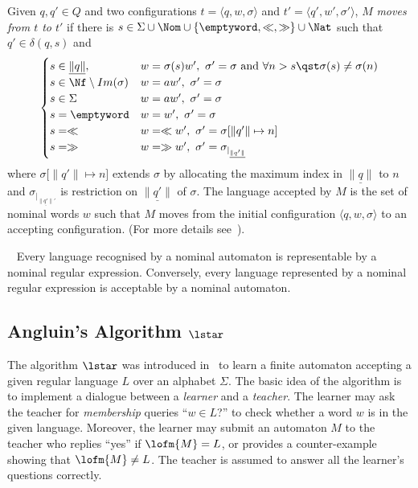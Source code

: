   Given $q,q'\in Q$ and two configurations
  $t=\langle q,w,\sigma\rangle$ and
  $t'=\langle q',w',\sigma' \rangle$, $M$ \emph{moves from $t$ to
    $t'$} if there is
  $s \in \Sigma \cup \Nom \cup \{\emptyword,\ll,\gg\} \cup \Nat$
  such that $q'\in \delta(q,s)$ and
  \[\begin{cases}
      s \in \underline{\|q\|}, & w=\sigma(s)w',\ \sigma'=\sigma \text{ and } \forall n > s \qst \sigma(s) \neq \sigma(n)
      \\
      s \in \Nf \setminus Im(\sigma) & w=aw',\ \sigma'=\sigma
      \\
      s \in \Sigma & w=aw',\ \sigma'=\sigma
      \\
      s = \emptyword & w=w',\ \sigma'=\sigma
      \\
      s = \ll & w=\ll w',\ \sigma' = \sigma \lbrack \|q'\| \mapsto n \rbrack
      \\
      s = \gg & w=\gg w', \ \sigma' = \sigma_{|_{\underline{\|q'\|}}}
    \end{cases}
  \]
  where $\sigma\lbrack\|q'\| \mapsto n\rbrack$ extends $\sigma$ by
  allocating the maximum index in $\underline{\|q\|}$ to $n$ and
  $\sigma_{|_{\underline{\|q'\|}'}}$ is restriction on
  $\underline{\|q'\|} $ of $\sigma$.
  The language accepted by $M$ is the set of nominal words $w$ such
  that $M$ moves from the initial configuration
  $\langle q,w,\sigma\rangle$ to an accepting configuration.
  (For more details see~\cite{Kurz0T12,Kurz0T13}).
  

  \begin{theorem}~\cite{Kurz0T2012}\label{thm:kleeneforNA} Every
    language recognised by a nominal automaton is representable by a
    nominal regular expression. Conversely, every language represented
    by a nominal regular expression is acceptable by a nominal
    automaton.
\end{theorem}


\subsection{Angluin's Algorithm $\lstar$}\label{st:Lstar}
The algorithm $\lstar$ was introduced in~\cite{Angluin87} to learn a
finite automaton accepting a given regular language $L$ over an
alphabet $\Sigma$.
%
The basic idea of the algorithm is to implement a dialogue between a
\emph{learner} and a \emph{teacher}.
%
The learner may ask the teacher for \textit{membership} queries
``$w \in L$?'' to check whether a word $w$ is in the given
language.
%
Moreover, the learner may submit an automaton $M$ to the teacher who
replies ``yes'' if $\lofm{M} = L$, or provides a counter-example
showing that $\lofm{M} \neq L$.
%
The teacher is assumed to answer all the learner's questions
correctly.

